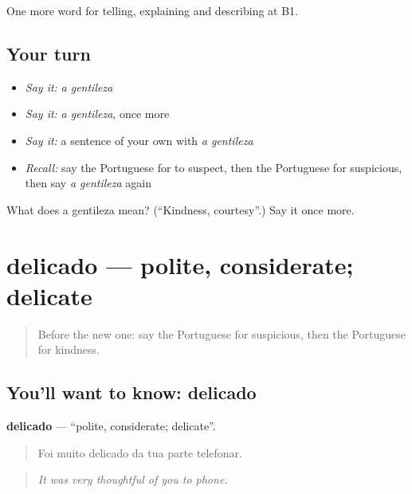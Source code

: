 \begin{grammarlens}[title={What you've built}]
One more word for telling, explaining and describing at B1.
\end{grammarlens}

\subsection*{Your turn}
\begin{itemize}
\raggedright
  \item \emph{Say it:} \emph{a gentileza}
  \item \emph{Say it:} \emph{a gentileza}, once more
  \item \emph{Say it:} a sentence of your own with \emph{a gentileza}
  \item \emph{Recall:} say the Portuguese for to suspect, then the Portuguese for suspicious, then say \emph{a gentileza} again
\end{itemize}

\begin{tcolorbox}[breakable,colback=teal!4,colframe=teal!35!black,title={Before you move on}]
What does a gentileza mean? (\textquotedblleft{}Kindness, courtesy\textquotedblright{}.) Say it once more.
\end{tcolorbox}
\section[delicado]{delicado — polite, considerate; delicate}

\label{lesson:PT-C473-delicado}



\begin{quote}
Before the new one: say the Portuguese for suspicious, then the Portuguese for kindness.
\end{quote}

\subsection*{You'll want to know: delicado}
\textbf{delicado} — \textquotedblleft{}polite, considerate; delicate\textquotedblright{}.

\begin{quote}
Foi muito delicado da tua parte telefonar.
\end{quote}

\begin{quote}
\emph{It was very thoughtful of you to phone.}
\end{quote}

